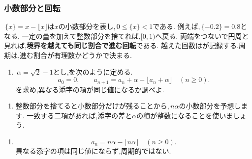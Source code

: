   \subsubsection{小数部分と回転}\label{節：ガウス型の小数部分と回転}
    \,$\{x\}=x-\lfloor x\rfloor$は$x$の小数部分を表し,\,$0\le\{x\}<1$である.
    例えば,\,$\{-0.2\}=0.8$となる.
    一定の量を加えて整数部分を捨てれば,$[0,1)$へ戻る.
    両端をつないで円周と見れば,\textbf{境界を越えても同じ割合で進む回転}である.
    越えた回数はが記録する.周期は,進む割合が有理数かどうかで決まる.

    \noindent {}\par\nobreak
    \begin{enumerate}[label=(\arabic*),parsep=3pt,beginpenalty=10000,format=\bookitemlink{example-gauss-role-9}{problem}{answer}]
      \item \,$\alpha=\sqrt2-1$とし,を次のように定める.
            \[
              a_0=0,\qquad
              a_{n+1}=a_n+\alpha-\lfloor a_n+\alpha\rfloor
              \quad(n\ge0).
            \]
            を求め,異なる添字の項が同じ値になるか調べよ.
    \end{enumerate}

    \noindent {}\par\nobreak
    \begin{enumerate}[label=(\arabic*),parsep=3pt,beginpenalty=10000,format=\bookitemlink{example-gauss-role-9}{hint}{problem}]
      \item 整数部分を捨てると小数部分だけが残ることから,\,$n\alpha$の小数部分を予想します.
            一致する二項があれば,添字の差と$\alpha$の積が整数になることを使いましょう.
    \end{enumerate}

    \noindent {}\par\nobreak
    \begin{enumerate}[label=(\arabic*),parsep=3pt,beginpenalty=10000,format=\bookitemlink{example-gauss-role-9}{answer}{problem}]
      \item \[
              a_n=n\alpha-\lfloor n\alpha\rfloor\quad(n\ge0).
            \]
            異なる添字の項は同じ値にならず,周期的ではない.
    \end{enumerate}

